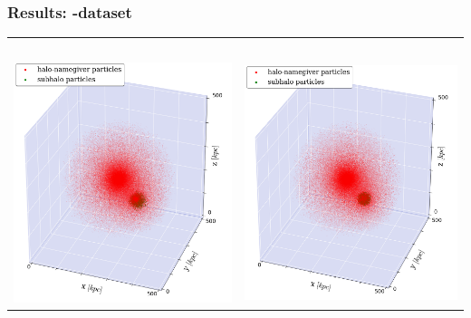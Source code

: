 \begin{frame}
	\frametitle{Results: \dt-dataset}
	
	\begin{tabular}{c c}
		\neigh\ 	& \iter \\[1.5em]
		{\includegraphics[width = .49\textwidth]{../report/images/dice-two/dice-two-plot-halo1451-saddle.png}} &
		{\includegraphics[width = .49\textwidth]{../report/images/dice-two/dice-two-plot-halo1451-iter.png}} \hspace*{-1em} 
	\end{tabular}
\end{frame}





